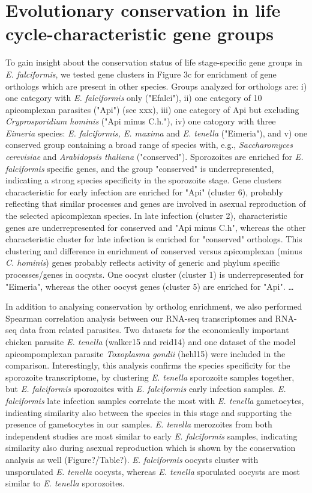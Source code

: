 \documentclass{bmcart}
\begin{document}
\section*{Evolutionary conservation in life cycle-characteristic gene groups}
To gain insight about the conservation status of life stage-specific gene groups in 
\textit{E. falciformis}, we tested gene clusters in Figure 3c for enrichment of gene orthologs which 
are present in other species. Groups analyzed for orthologs are: i) one category with \textit{E. falciformis} only ("Efalci"), ii) one category of 10 apicomplexan parasites ("Api") (see xxx), iii) one category of Api but excluding \textit{Cryprosporidium hominis} ("Api minus C.h."), iv) one catogory with three \textit{Eimeria} species: \textit{E. falciformis, E. maxima} and \textit{E. tenella} ("Eimeria"), and v) one conserved group containing a broad range of species with, e.g., \textit{Saccharomyces cerevisiae} and \textit{Arabidopsis thaliana} ("conserved"). 
Sporozoites are enriched for \textit{E. falciformis} specific genes, and the group "conserved" is underrepresented, indicating a strong species specificity in the sporozoite stage. Gene clusters characteristic for early infection are enriched for "Api" (cluster 6), probably reflecting that similar processes and genes are involved in asexual reproduction of the selected apicomplexan species. In late infection (cluster 2), characteristic genes are underrepresented for conserved and "Api minus C.h", whereas the other characteristic cluster for late infection is enriched for "conserved" orthologs. This clustering and difference in enrichment of conserved versus apicomplexan (minus \textit{C. hominis}) genes probably reflects activity of generic and phylum specific processes/genes in oocysts.
One oocyst cluster (cluster 1) is underrepresented for "Eimeria", whereas the other oocyst genes (cluster 5) are enriched for "Api". 
\ldots

In addition to analysing conservation by ortholog enrichment, we also performed Spearman correlation analysis between our RNA-seq transcriptomes and RNA-seq data from related parasites. Two datasets for the economically important chicken parasite \textit{E. tenella} (walker15 and reid14) and one dataset of the model apicompomplexan parasite \textit{Toxoplasma gondii} (hehl15) were included in the comparison. Interestingly, this analysis confirms the species specificity for the sporozoite transcriptome, by clustering \textit{E. tenella} sporozoite samples together, but \textit{E. falciformis} sporozoites with \textit{E. falciformis} early infection samples. \textit{E. falciformis} late infection samples correlate the most with \textit{E. tenella} gametocytes, indicating similarity also between the species in this stage and supporting the presence of gametocytes in our samples. \textit{E. tenella} merozoites from both independent studies are most similar to early \textit{E. falciformis} samples, indicating similarity also during asexual reproduction which is shown by the conservation analysis as well (Figure?/Table?). \textit{E. falciformis} oocysts cluster with unsporulated \textit{E. tenella} oocysts, whereas \textit{E. tenella} sporulated oocysts are most similar to \textit{E. tenella} sporozoites. 
\end{document}
